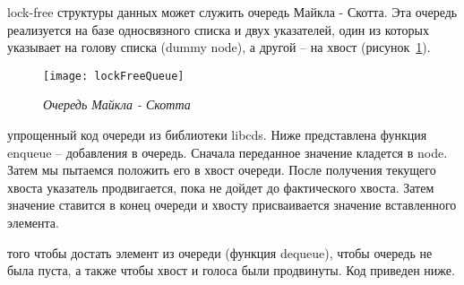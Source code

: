 {	 lock-free структуры данных может служить очередь Майкла - Скотта. Эта очередь реализуется на базе односвязного списка и двух указателей, один из которых указывает на голову списка (dummy node), а другой -- на хвост (рисунок~\ref{lockFreeQueue:image}).
	\begin{figure}[H]
		\texttt{[image: lockFreeQueue]}
		\caption{\textit{Очередь Майкла - Скотта}}
		\label{lockFreeQueue:image}
	\end{figure}
	 упрощенный код очереди из библиотеки libcds. Ниже представлена функция enqueue -- добавления в очередь. Сначала переданное значение кладется в node. Затем мы пытаемся положить его в хвост очереди. После получения текущего хвоста указатель продвигается, пока не дойдет до фактического хвоста. Затем значение ставится в конец очереди и хвосту присваивается значение вставленного элемента.
	\begin{figure}[H]
		
	\end{figure}
	 того чтобы достать элемент из очереди (функция dequeue), чтобы очередь не была пуста, а также чтобы хвост и голоса были продвинуты. Код приведен ниже.
	\begin{figure}[H]
		
	\end{figure}
}